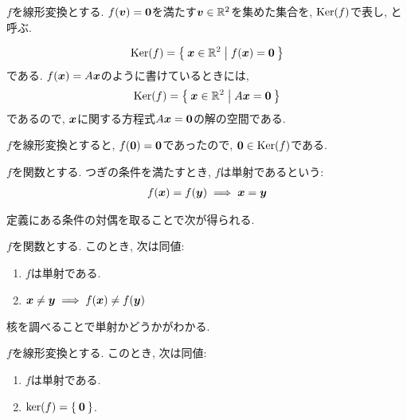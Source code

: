 \begin{definition}
  \label{def:ker}
  $f$を線形変換とする.
  $f(\boldsymbol{v})=\boldsymbol{0}$を満たす$\boldsymbol{v}\in\mathbb{R}^2$を集めた集合を,
  $\operatorname{Ker}(f)$で表し,
  と呼ぶ.
\end{definition}
\begin{remark}
  \begin{align*}
    \operatorname{Ker}(f)=\Set{\boldsymbol{x}\in\mathbb{R}^2|f(\boldsymbol{x})=\boldsymbol{0}}
  \end{align*}
  である.  $f(\boldsymbol{x})=A\boldsymbol{x}$のように書けているときには,
  \begin{align*}
    \operatorname{Ker}(f)=\Set{\boldsymbol{x}\in\mathbb{R}^2|A\boldsymbol{x}=\boldsymbol{0}}
  \end{align*}
  であるので,
  $\boldsymbol{x}$に関する方程式$A\boldsymbol{x}=\boldsymbol{0}$の解の空間である.  
\end{remark}
\begin{remark}
  $f$を線形変換とすると, $f(\boldsymbol{0})=\boldsymbol{0}$であったので,
  $\boldsymbol{0}\in\operatorname{Ker}(f)$である.
\end{remark}
\begin{definition}
  \label{def:inj}
  $f$を関数とする.
  つぎの条件を満たすとき,
  $f$は単射であるという:
  \begin{align*}
    f(\boldsymbol{x})=f(\boldsymbol{y})\implies \boldsymbol{x}=\boldsymbol{y}
  \end{align*}
\end{definition}
定義にある条件の対偶を取ることで次が得られる.
\begin{cor}
  $f$を関数とする.
  このとき, 次は同値:
  \begin{enumerate}
  \item $f$は単射である.
  \item $\boldsymbol{x}\neq\boldsymbol{y} \implies f(\boldsymbol{x})\neq f(\boldsymbol{y})$
  \end{enumerate}
\end{cor}
核を調べることで単射かどうかがわかる.
\begin{prop}
  $f$を線形変換とする.
  このとき, 次は同値:
  \begin{enumerate}
  \item\label{thm:kernel:ing:item:inj}
    $f$は単射である.
  \item\label{thm:kernel:ing:item:ker}
    $\ker(f)=\Set{\boldsymbol{0}}$.
  \end{enumerate}
\end{prop}
